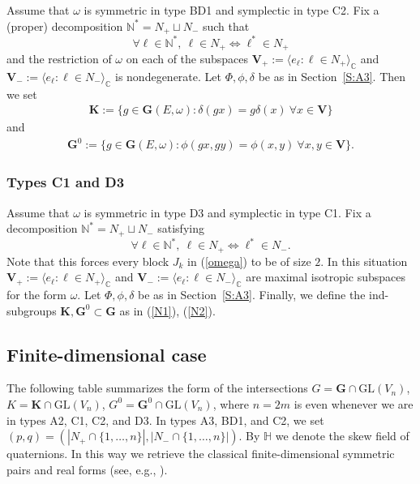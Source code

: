 \documentclass{amsart}
\theoremstyle{definition}
\newcommand{\NN}{\mathbb{N}^*}
\begin{document}
Assume that $\omega$ is symmetric in type BD1 and symplectic in type C2.
Fix a (proper) decomposition $\NN=N_+\sqcup N_-$ such that
\[\forall \ell\in\NN,\ \ell\in N_+\Leftrightarrow \ell^*\in N_+\]
and the restriction of $\omega$ on each of the subspaces $\mathbf{V}_+:=\langle e_\ell:\ell\in N_+\rangle_\mathbb{C}$ and
$\mathbf{V}_-:=\langle e_\ell:\ell\in N_-\rangle_\mathbb{C}$ is nondegenerate.
Let $\Phi,\phi,\delta$ be as in Section~\ref{S:A3}.  Then we set
\begin{eqnarray}
\label{N1}
 \mathbf{K}:=\{g\in \mathbf{G}(E,\omega):\delta(gx)=g\delta(x)\ \forall
x\in\mathbf{V}\}
\end{eqnarray}
and
\begin{eqnarray}
\label{N2}
 \mathbf{G}^0:=\{g\in \mathbf{G}(E,\omega):\phi(gx,gy)=\phi(x,y)\ \forall
 x,y\in\mathbf{V}\}.
\end{eqnarray}


\subsubsection{Types C1 and D3}
\label{S:C1D3}
Assume that $\omega$ is symmetric in type D3 and symplectic in type C1.
Fix a decomposition $\NN=N_+\sqcup N_-$ satisfying
\[
\forall \ell\in\NN,\ \ell\in N_+\Leftrightarrow \ell^*\in N_-.
\]
Note that this forces every block $J_k$ in (\ref{omega}) to be of size $2$.
In this situation $\mathbf{V}_+:=\langle e_\ell:\ell\in N_+\rangle_\mathbb{C}$ and $\mathbf{V}_-:=\langle e_\ell:\ell\in N_-\rangle_\mathbb{C}$
are maximal isotropic subspaces for the form $\omega$.
Let $\Phi,\phi,\delta$ be as in Section~\ref{S:A3}. Finally, we define the ind-subgroups $\mathbf{K},\mathbf{G}^0\subset\mathbf{G}$ as in (\ref{N1}), (\ref{N2}).


\subsection*{Finite-dimensional case} 
The following table summarizes the form of the intersections $G=\textbf{G}\cap\mathrm{GL}\left(V_n\right)$, $K=\textbf{K}\cap\mathrm{GL}\left(V_n\right)$, $G^0=\textbf{G}^0\cap\mathrm{GL}\left(V_n\right)$, where $n=2m$ is even whenever we are in types A2, C1, C2, and D3.
In types A3, BD1, and C2, we set $(p,q)=(|N_+\cap\{1,\ldots,n\}|,|N_-\cap\{1,\ldots,n\}|)$.
By $\mathbb{H}$ we denote the skew field of quaternions.
In this way we retrieve the classical finite-dimensional symmetric pairs and real forms
(see, e.g., \cite{Berger,OV,Otha1}).
\end{document}
